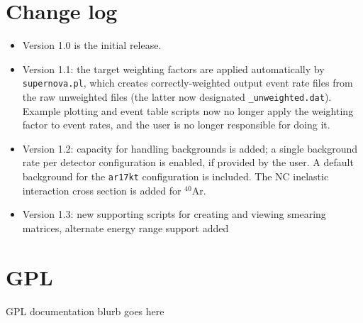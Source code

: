 \documentclass[12pt]{article}
\begin{document}
\appendix
\section{Change log}

\begin{itemize}
\item Version 1.0 is the initial release.
\item Version 1.1:  the target weighting factors are applied automatically by \texttt{supernova.pl}, which creates correctly-weighted output event rate files from the raw unweighted files (the latter now designated \texttt{\_unweighted.dat}).  Example plotting and event table scripts now no longer apply the weighting factor to event rates, and the user is no longer responsible for doing it.
\item Version 1.2: capacity for handling backgrounds is added; a single background rate per detector configuration is enabled, if provided by the user.  A default background for the \texttt{ar17kt} configuration is included. The NC inelastic interaction cross section is added for $^{40}$Ar.
\item Version 1.3: new supporting scripts for creating and viewing smearing matrices, alternate energy range support added

 \end{itemize}


\section{GPL}

GPL documentation blurb goes here




\end{document}
